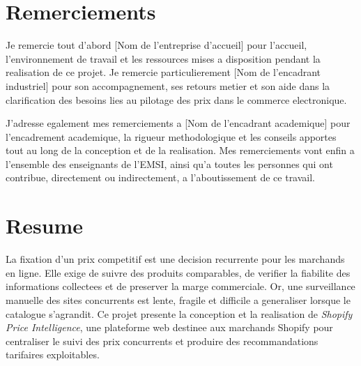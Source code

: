 \documentclass[12pt,a4paper,oneside]{report}
\newcommand{\academicAdvisor}{\textcolor{placeholderRed}{[Nom de l'encadrant academique]}}
\newcommand{\industryAdvisor}{\textcolor{placeholderRed}{[Nom de l'encadrant industriel]}}
\newcommand{\hostCompany}{\textcolor{placeholderRed}{[Nom de l'entreprise d'accueil]}}
\newif\ifdedication
\begin{document}
\setcounter{page}{1}

\ifdedication
\chapter*{Dedicace}
\addcontentsline{toc}{chapter}{Dedicace}
\thispagestyle{plain}
\vspace*{5cm}
\begin{flushright}
\textit{[Dedicace personnelle a completer.]}
\end{flushright}
\clearpage
\fi

\chapter*{Remerciements}
\thispagestyle{plain}
Je remercie tout d'abord \hostCompany{} pour l'accueil, l'environnement de travail et les ressources mises a disposition pendant la realisation de ce projet. Je remercie particulierement \industryAdvisor{} pour son accompagnement, ses retours metier et son aide dans la clarification des besoins lies au pilotage des prix dans le commerce electronique.

J'adresse egalement mes remerciements a \academicAdvisor{} pour l'encadrement academique, la rigueur methodologique et les conseils apportes tout au long de la conception et de la realisation. Mes remerciements vont enfin a l'ensemble des enseignants de l'EMSI, ainsi qu'a toutes les personnes qui ont contribue, directement ou indirectement, a l'aboutissement de ce travail.

\clearpage

\chapter*{Resume}
\thispagestyle{plain}
La fixation d'un prix competitif est une decision recurrente pour les marchands en ligne. Elle exige de suivre des produits comparables, de verifier la fiabilite des informations collectees et de preserver la marge commerciale. Or, une surveillance manuelle des sites concurrents est lente, fragile et difficile a generaliser lorsque le catalogue s'agrandit. Ce projet presente la conception et la realisation de \textit{Shopify Price Intelligence}, une plateforme web destinee aux marchands Shopify pour centraliser le suivi des prix concurrents et produire des recommandations tarifaires exploitables.
\end{document}

